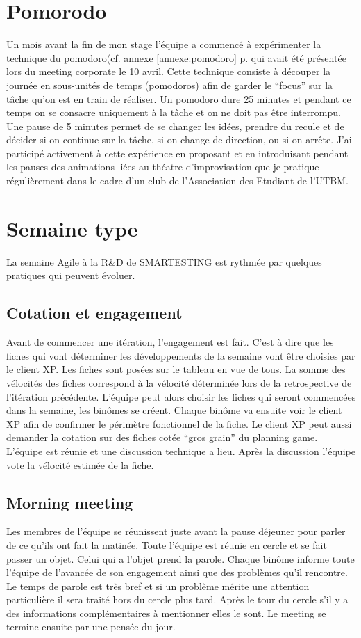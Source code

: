 \section{Pomorodo}
Un mois avant la fin de mon stage l'équipe a commencé à expérimenter la technique du pomodoro(cf. annexe \ref{annexe:pomodoro} p.\pageref{annexe:pomodoro} qui avait été présentée lors du meeting corporate le 10 avril. Cette technique consiste à découper la journée en sous-unités de temps (pomodoros) afin de garder le ``focus'' sur la tâche qu'on est en train de réaliser. Un pomodoro dure 25 minutes et pendant ce temps on se consacre uniquement à la tâche et on ne doit pas être interrompu. Une pause de 5 minutes permet de se changer les idées, prendre du recule et de décider si on continue sur la tâche, si on change de direction, ou si on arrête. J'ai participé activement à cette expérience en proposant et en introduisant pendant les pauses des animations liées au théatre d'improvisation que je pratique régulièrement dans le cadre d'un club de l'Association des Etudiant de l'UTBM.

\section{Semaine type}
La semaine Agile à la R\&D de SMARTESTING est rythmée par quelques pratiques qui peuvent évoluer.
\subsection*{Cotation et engagement}
Avant de commencer une itération, l'engagement est fait. C'est à dire que les fiches qui vont déterminer les développements de la semaine vont être choisies par le client XP. Les fiches sont posées sur le tableau en vue de tous. La somme des vélocités des fiches correspond à la vélocité déterminée lors de la retrospective de l'itération précédente. L'équipe peut alors choisir les fiches qui seront commencées dans la semaine, les binômes se créent. Chaque binôme va ensuite voir le client XP afin de confirmer le périmètre fonctionnel de la fiche. Le client XP peut aussi demander la cotation sur des fiches cotée ``gros grain'' du planning game. L'équipe est réunie et une discussion technique a lieu. Après la discussion l'équipe vote la vélocité estimée de la fiche. 

\subsection*{Morning meeting}
Les membres de l'équipe se réunissent juste avant la pause déjeuner pour parler de ce qu'ils ont fait la matinée. Toute l'équipe est réunie en cercle et se fait passer un objet. Celui qui a l'objet prend la parole. Chaque binôme informe toute l'équipe de l'avancée de son engagement ainsi que des problèmes qu'il rencontre. Le temps de parole est très bref et si un problème mérite une attention particulière il sera traité hors du cercle plus tard. Après le tour du cercle s'il y a des informations complémentaires à mentionner elles le sont. Le meeting se termine ensuite par une pensée du jour.

